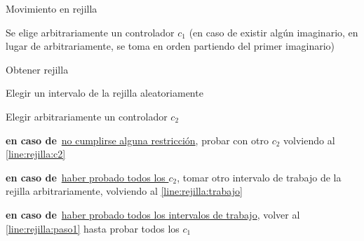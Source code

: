 \begin{algorithm}[h]
	
	\caption{Movimiento en rejilla}

	\label{algoritmo:movRejilla}
    \SetAlgoNoEnd
    Se elige arbitrariamente un controlador $c_1$ (en caso de existir algún imaginario, en lugar de arbitrariamente, se toma en orden partiendo \newline del primer imaginario) \label{line:rejilla:paso1}\;
    \algovspace

    Obtener rejilla\;
    \algovspace

    Elegir un intervalo de la rejilla aleatoriamente \label{line:rejilla:trabajo}\;
    \algovspace

    Elegir arbitrariamente un controlador $c_2$ \label{line:rejilla:c2}\;
    \algovspace

    \algovspace

    \textbf{en caso de\,} \underline{no cumplirse alguna restricción}, probar con otro $c_2$ volviendo al \autoref{line:rejilla:c2}\;
    \algovspace

    \textbf{en caso de\,} \underline{haber probado todos los $c_2$}, tomar otro intervalo de trabajo de la rejilla arbitrariamente, volviendo al \autoref{line:rejilla:trabajo}\;
    \algovspace

    \textbf{en caso de\,} \underline{haber probado todos los intervalos de trabajo}, volver al \autoref{line:rejilla:paso1} hasta probar todos los $c_1$\;
    \algovspace
\end{algorithm}

